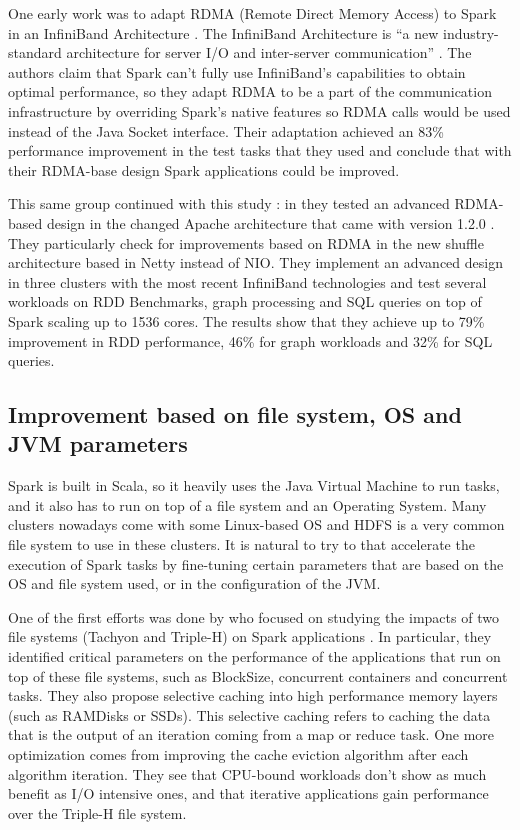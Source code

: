 \documentclass{article}
\begin{document}
One early work was to adapt RDMA (Remote Direct Memory Access) to Spark in an InfiniBand Architecture \cite{Lu2014}. The InfiniBand Architecture is ``a new industry-standard architecture for server I/O and inter-server communication'' \cite{pfister2001introduction}. The authors claim that Spark can't fully use InfiniBand's capabilities to obtain optimal performance, so they adapt RDMA to be a part of the communication infrastructure by overriding Spark's native features so RDMA calls would be used instead of the Java Socket interface. Their adaptation achieved an 83\% performance improvement in the test tasks that they used and conclude that with their RDMA-base design Spark applications could be improved.

This same group continued with this study \cite{Lu2016}: in \citeyear{Lu2016} they tested an advanced RDMA-based design in the changed Apache architecture that came with version 1.2.0 \cite{Armbrust2015}. They particularly check for improvements based on RDMA in the new shuffle architecture based in Netty instead of NIO. They implement an advanced design in three clusters with the most recent InfiniBand technologies and test several workloads on RDD Benchmarks, graph processing and SQL queries on top of Spark scaling up to 1536 cores. The results show that they achieve up to 79\% improvement in RDD performance, 46\% for graph workloads and 32\% for SQL queries. 

\subsection{Improvement based on file system, OS and JVM parameters}

Spark is built in Scala, so it heavily uses the Java Virtual Machine to run tasks, and it also has to run on top of a file system and an Operating System. Many clusters nowadays come with some Linux-based OS and HDFS is a very common file system to use in these clusters. It is natural to try to that accelerate the execution of Spark tasks by fine-tuning certain parameters that are based on the OS and file system used, or in the configuration of the JVM.

One of the first efforts was done by \citeauthor{Islam2015} who focused on studying the impacts of two file systems (Tachyon and Triple-H) on Spark applications \cite{Islam2015}. In particular, they identified critical parameters on the performance of the applications that run on top of these file systems, such as BlockSize, concurrent containers and concurrent tasks. They also propose selective caching into high performance memory layers (such as RAMDisks or SSDs). This selective caching refers to caching the data that is the output of an iteration coming from a map or reduce task. One more optimization comes from improving the cache eviction algorithm after each algorithm iteration. They see that CPU-bound workloads don't show as much benefit as I/O intensive ones, and that iterative applications gain performance over the Triple-H file system.
\end{document}
